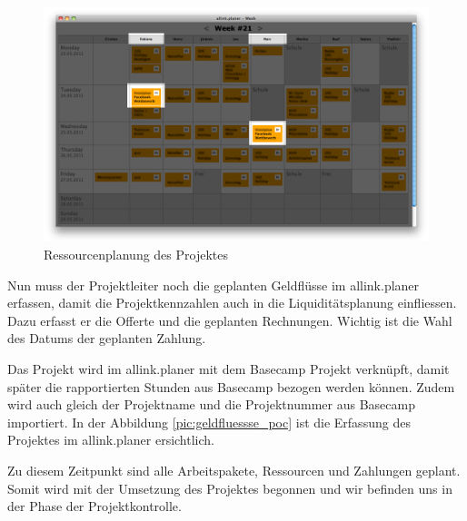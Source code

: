 \clearpage

\begin{figure}[htbp]
\begin{center}
\includegraphics[width=1.0\textwidth,angle=0]{./bilder/proof_of_concept/ressourenplan_poc.png}
\caption[Ressourcenplanung des Projektes]{Ressourcenplanung des Projektes\footnotemark}
\label{pic:ressourenplan_poc}
\end{center}
\end{figure}

Nun muss der Projektleiter noch die geplanten Geldflüsse im allink.planer erfassen, 
damit die Projektkennzahlen auch in die Liquiditätsplanung einfliessen. Dazu erfasst er
die Offerte und die geplanten Rechnungen. Wichtig ist die Wahl des Datums der 
geplanten Zahlung.

Das Projekt wird im allink.planer mit dem Basecamp Projekt verknüpft, damit später 
die rapportierten Stunden aus Basecamp bezogen werden können. Zudem wird auch gleich der Projektname
und die Projektnummer aus Basecamp importiert. In der Abbildung \ref{pic:geldfluessse_poc}
ist die Erfassung des Projektes im allink.planer ersichtlich.

Zu diesem Zeitpunkt sind alle Arbeitspakete, Ressourcen und Zahlungen geplant.
Somit wird mit der Umsetzung des Projektes begonnen und wir befinden uns in der
Phase der Projektkontrolle.

\clearpage

